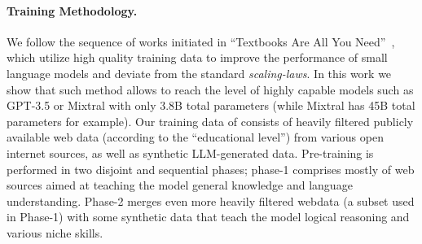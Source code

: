 \documentclass[11pt]{article}
\begin{document}
\paragraph{Training Methodology.} We follow the sequence of works initiated in ``Textbooks Are All You Need''~\cite{gunasekar2023textbooks}, which utilize high quality training data to improve the performance of small language models and deviate from the standard {\em scaling-laws}. In this work we show that such method allows to reach the level of highly capable models such as GPT-3.5 or Mixtral with only 3.8B total parameters (while Mixtral has 45B total parameters for example). Our training data of consists of heavily filtered publicly available web data (according to the ``educational level'') from various open internet sources, as well as synthetic LLM-generated data. Pre-training is performed in two disjoint and sequential phases; phase-1 comprises mostly of web sources aimed at teaching the model general knowledge and language understanding. Phase-2 merges even more heavily filtered webdata (a subset used in Phase-1) with some synthetic data that teach the model logical reasoning and various niche skills. 
\end{document}
